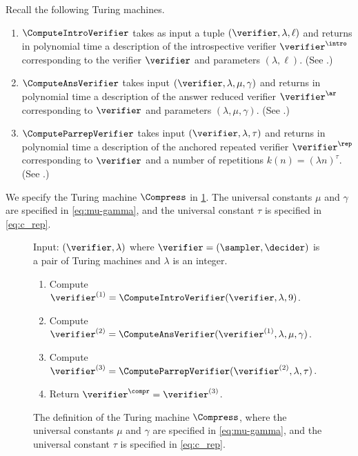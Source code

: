 Recall the following Turing machines. 
\begin{enumerate}
\item $\ComputeIntroVerifier$ takes as input a tuple $(\verifier, \lambda,
  \ell)$ and returns in polynomial time a description of the
  introspective verifier $\verifier^\intro$ corresponding to the verifier
  $\verifier$ and parameters $(\lambda, \ell)$. (See .)

\item $\ComputeAnsVerifier$ takes input $(\verifier, \lambda, \mu, \gamma)$ and returns
  in polynomial time a description of the answer reduced verifier
  $\verifier^\ar$ corresponding to $\verifier$ and parameters $(\lambda, \mu, \gamma)$. (See .)

\item $\ComputeParrepVerifier$ takes input $(\verifier, \lambda, \tau)$ and returns in
  polynomial time a description of the anchored repeated verifier $\verifier^\rep$
  corresponding to $\verifier$ and a number of repetitions $k(n) = (\lambda n)^\tau$. (See .)
\end{enumerate}

We specify the Turing machine $\Compress$ in \cref{fig:compress}. The universal constants $\mu$ and $\gamma$ are specified in \cref{eq:mu-gamma}, and the universal constant $\tau$ is specified in \cref{eq:c_rep}.

\begin{figure}[H]
  \centering
  \begin{gamespec}
  	Input: $(\verifier, \lambda)$ where $\verifier = (\sampler,\decider)$ is a pair of Turing machines and $\lambda$ is an integer.
    \begin{enumerate}


		\item \label{enu:compress-intro} Compute $\verifier^{(1)} =
      \ComputeIntroVerifier(\verifier, \lambda, 9)$.

		\item \label{enu:compress-ans} Compute $\verifier^{(2)} =
      \ComputeAnsVerifier(\verifier^{(1)}, \lambda, \mu, \gamma)$.



		\item \label{enu:compress-rep} Compute $\verifier^{(3)} =
      \ComputeParrepVerifier(\verifier^{(2)}, \lambda, \tau)$.

		\item Return $\verifier^\compr = \verifier^{(3)}$.
	\end{enumerate}
  \end{gamespec}
  \caption{The definition of the Turing machine $\Compress$, where the universal constants $\mu$ and $\gamma$ are specified in \cref{eq:mu-gamma}, and the universal constant $\tau$ is specified in \cref{eq:c_rep}.}
  \label{fig:compress}
\end{figure}









